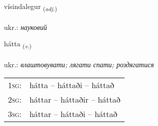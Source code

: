 \documentclass[frontgrid, backgrid]{flacards}\usepackage[]{graphicx}\usepackage[]{xcolor}
\begin{document}
\renewcommand{\flhead}{\vskip5pt \fboxsep=0pt {\small\bfseries\footnotesize Lýsingarorð | прикметник}}
\renewcommand{\fcfoot}{\vskip5pt \fboxsep=0pt \hspace{2pt}{\small\bfseries\footnotesize 3K}}

\renewcommand{\blhead}{\vskip5pt {\small\bfseries\footnotesize Lýsingarorð | прикметник }}
\renewcommand{\bcfoot}{\vskip5pt \hspace{2pt}{\small\bfseries\footnotesize 3K}}


{vísindalegur \small{\textsubscript{(\textit{adj.})}} \\[1ex] %
\textphonetic{[viːsɪntalɛɣʏr]} \\
ukr.: \emph{науковий} \\  [2ex]
\renewcommand*{\arraystretch}{0.8}
}

\renewcommand{\flhead}{\vskip5pt \fboxsep=0pt {\small\bfseries\footnotesize Sagnorð | дієслово}}
\renewcommand{\fcfoot}{\vskip5pt \fboxsep=0pt \hspace{2pt}{\small\bfseries\footnotesize 3K}}

\renewcommand{\blhead}{\vskip5pt {\small\bfseries\footnotesize Sagnorð | дієслово }}
\renewcommand{\bcfoot}{\vskip5pt \hspace{2pt}{\small\bfseries\footnotesize 3K}}


{hátta \small{\textsubscript{(\textit{v.})}} \\[1ex] %
\textphonetic{[hauhta]} \\
ukr.: \emph{влаштовувати; лягати спати; роздягатися} \\  [2ex]
\renewcommand*{\arraystretch}{0.8}
\begin{tabular}{p{1cm}l}
\textsc{1sg}: & hátta -- háttaði -- háttað \\ 
\textsc{2sg}: & háttar -- háttaðir -- háttað \\ 
\textsc{3sg}: & háttar -- háttaði -- háttað \\ 
\end{tabular}
}
\end{document}
